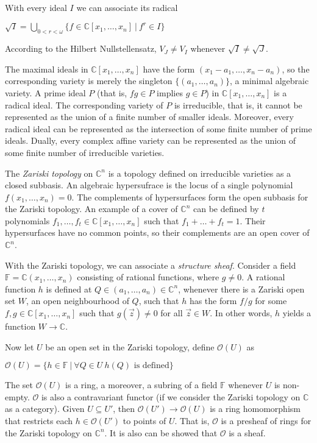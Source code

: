 \documentclass[a4paper]{article}
\theoremstyle{defin}
\theoremstyle{theorem}
\theoremstyle{claim}
\theoremstyle{prop}
\theoremstyle{lemma}
\theoremstyle{fact}
\theoremstyle{ex}
\theoremstyle{col}
\begin{document}
With every ideal $I$ we can associate its radical
\begin{center}
$\sqrt{I} = \bigcup \limits_{0 < r < \omega} \{ f \in \mathbb{C}[x_1, \dots, x_n] \: | \: f^r \in I \}$
\end{center}
According to the Hilbert Nullstellensatz, $V_J \neq V_I$ whenever $\sqrt{I} \neq \sqrt{J}$.

The maximal ideals in $\mathbb{C}[x_1, \dots, x_n]$ have the form $(x_1 - a_1, \dots, x_n - a_n)$, so the corresponding variety is merely the singleton $\{ (a_1, \dots, a_n) \}$, a minimal algebraic variety. A prime ideal $P$ (that is, $fg \in P$ implies $g \in P$) in $\mathbb{C}[x_1, \dots, x_n]$ is a radical ideal. The corresponding variety of $P$ is irreducible, that is, it cannot be represented as the union of a finite number of smaller ideals. Moreover, every radical ideal can be represented as the intersection of some finite number of prime ideals. Dually, every complex affine variety can be represented as the union of some finite number of irreducible varieties.

The \emph{Zariski topology} on $\mathbb{C}^n$ is a topology defined on irreducible varieties as a closed subbasis. An algebraic hypersufrace is the locus of a single polynomial $f(x_1, \dots, x_n) = 0$. The complements of hypersurfaces form the open subbasis for the Zariski topology. An example of a cover of $\mathbb{C}^n$ can be defined by $t$ polynomials $f_1, \dots, f_t \in \mathbb{C}[x_1, \dots, x_n]$ such that $f_1 + \dots + f_t = 1$. Their hypersurfaces have no common points, so their complements are an open cover of $\mathbb{C}^n$.

With the Zariski topology, we can associate a \emph{structure sheaf}. Consider a field $\mathbb{F} = \mathbb{C}(x_1, \dots, x_n)$ consisting of rational functions, where $g \neq 0$. A rational function $h$ is defined at $Q \in (a_1, \dots, a_n) \in \mathbb{C}^n$, whenever there is a Zariski open set $W$, an open neighbourhood of $Q$, such that $h$ has the form $f/g$ for some $f, g \in \mathbb{C}[x_1, \dots, x_n]$ such that $g(\vec{z}) \neq 0$ for all $\vec{z} \in W$. In other words, $h$ yields a function $W \to \mathbb{C}$.

Now let $U$ be an open set in the Zariski topology, define $\mathcal{O}(U)$ as
\begin{center}
$\mathcal{O}(U) = \{ h \in \mathbb{F} \: | \: \forall Q \in U \: \text{$h(Q)$ is defined} \}$
\end{center}
The set $\mathcal{O}(U)$ is a ring, a moreover, a subring of a field $\mathbb{F}$ whenever $U$ is non-empty. $\mathcal{O}$ is also a contravariant functor (if we consider the Zariski topology on $\mathbb{C}$ as a category). Given $U \subseteq U'$, then $\mathcal{O}(U') \to \mathcal{O}(U)$ is a ring homomorphism that restricts each $h \in \mathcal{O}(U')$ to points of $U$. That is, $\mathcal{O}$ is a presheaf of rings for the Zariski topology on $\mathbb{C}^n$. It is also can be showed that $\mathcal{O}$ is a sheaf.
\end{document}
